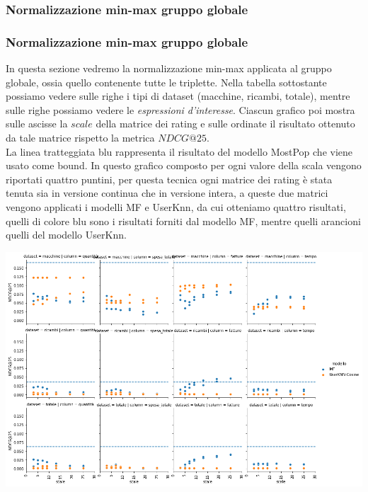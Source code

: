 \subsubsection{Normalizzazione min-max gruppo globale}

\subsubsection{Normalizzazione min-max gruppo globale}
In questa sezione vedremo la normalizzazione min-max applicata al gruppo globale, ossia quello contenente tutte le triplette.
Nella tabella sottostante possiamo vedere sulle righe i tipi di dataset (macchine, ricambi, totale), mentre sulle righe possiamo vedere le \textit{espressioni d'interesse}. Ciascun grafico poi mostra sulle ascisse la $scale$ della matrice dei rating e sulle ordinate il risultato ottenuto da tale matrice rispetto la metrica $NDCG@25$. \\
La linea tratteggiata blu rappresenta il risultato del modello MostPop che viene usato come bound.
In questo grafico composto per ogni valore della scala vengono riportati quattro puntini, per questa tecnica ogni matrice dei rating è stata tenuta sia in versione continua che in versione intera, a queste due matrici vengono applicati i modelli MF e UserKnn, da cui otteniamo quattro risultati, quelli di colore blu sono i risultati forniti dal modello MF, mentre quelli arancioni quelli del modello UserKnn.

\includegraphics[width=16cm]{figures/risultati_minmax_globale.png}

